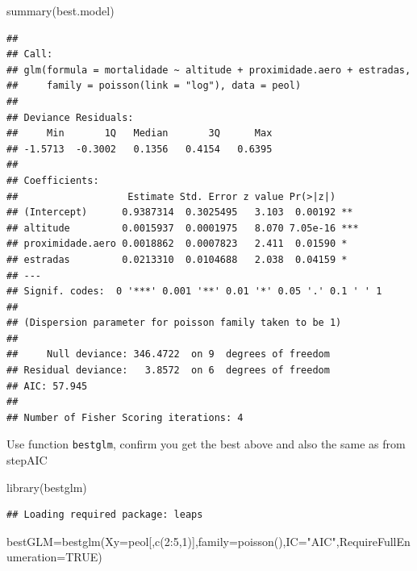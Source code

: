 \documentclass[
]{book}
\newenvironment{Shaded}{\begin{snugshade}}{\end{snugshade}}
\newcommand{\AttributeTok}[1]{\textcolor[rgb]{0.77,0.63,0.00}{#1}}
\newcommand{\ConstantTok}[1]{\textcolor[rgb]{0.00,0.00,0.00}{#1}}
\newcommand{\DecValTok}[1]{\textcolor[rgb]{0.00,0.00,0.81}{#1}}
\newcommand{\FunctionTok}[1]{\textcolor[rgb]{0.00,0.00,0.00}{#1}}
\newcommand{\NormalTok}[1]{#1}
\newcommand{\OtherTok}[1]{\textcolor[rgb]{0.56,0.35,0.01}{#1}}
\newcommand{\SpecialCharTok}[1]{\textcolor[rgb]{0.00,0.00,0.00}{#1}}
\newcommand{\StringTok}[1]{\textcolor[rgb]{0.31,0.60,0.02}{#1}}
\begin{document}
\begin{Shaded}
\begin{Highlighting}[]
\FunctionTok{summary}\NormalTok{(best.model)}
\end{Highlighting}
\end{Shaded}

\begin{verbatim}
## 
## Call:
## glm(formula = mortalidade ~ altitude + proximidade.aero + estradas, 
##     family = poisson(link = "log"), data = peol)
## 
## Deviance Residuals: 
##     Min       1Q   Median       3Q      Max  
## -1.5713  -0.3002   0.1356   0.4154   0.6395  
## 
## Coefficients:
##                   Estimate Std. Error z value Pr(>|z|)    
## (Intercept)      0.9387314  0.3025495   3.103  0.00192 ** 
## altitude         0.0015937  0.0001975   8.070 7.05e-16 ***
## proximidade.aero 0.0018862  0.0007823   2.411  0.01590 *  
## estradas         0.0213310  0.0104688   2.038  0.04159 *  
## ---
## Signif. codes:  0 '***' 0.001 '**' 0.01 '*' 0.05 '.' 0.1 ' ' 1
## 
## (Dispersion parameter for poisson family taken to be 1)
## 
##     Null deviance: 346.4722  on 9  degrees of freedom
## Residual deviance:   3.8572  on 6  degrees of freedom
## AIC: 57.945
## 
## Number of Fisher Scoring iterations: 4
\end{verbatim}

Use function \texttt{bestglm}, confirm you get the best above and also the same as from stepAIC

\begin{Shaded}
\begin{Highlighting}[]
\FunctionTok{library}\NormalTok{(bestglm)}
\end{Highlighting}
\end{Shaded}

\begin{verbatim}
## Loading required package: leaps
\end{verbatim}

\begin{Shaded}
\begin{Highlighting}[]
\NormalTok{bestGLM}\OtherTok{=}\FunctionTok{bestglm}\NormalTok{(}\AttributeTok{Xy=}\NormalTok{peol[,}\FunctionTok{c}\NormalTok{(}\DecValTok{2}\SpecialCharTok{:}\DecValTok{5}\NormalTok{,}\DecValTok{1}\NormalTok{)],}\AttributeTok{family=}\FunctionTok{poisson}\NormalTok{(),}\AttributeTok{IC=}\StringTok{"AIC"}\NormalTok{,}\AttributeTok{RequireFullEnumeration=}\ConstantTok{TRUE}\NormalTok{)}
\end{Highlighting}
\end{Shaded}
\end{document}
